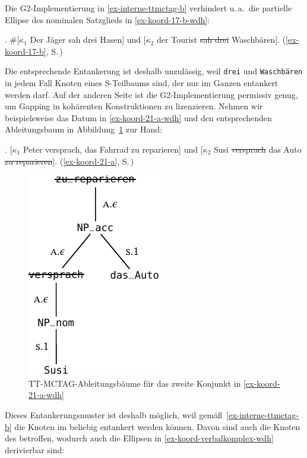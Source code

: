 Die G2-Implementierung in \ref{ex-interne-ttmctag-b} verhindert u.\,a.\ die partielle Ellipse des nominalen Satzglieds in \ref{ex-koord-17-b-wdh}:

\ex. \#[$\kappa_1$ Der Jäger sah drei Hasen] und [$\kappa_2$ der Tourist \sout{sah drei} Waschbären]. \hfill
(\ref{ex-koord-17-b}, S.\,\pageref{ex-koord-17-b})\label{ex-koord-17-b-wdh}

Die entsprechende Entankerung ist deshalb unzulässig, weil {\tt drei} und {\tt Waschbä\-ren} in jedem Fall Knoten eines S-Teilbaums sind, der nur im Ganzen entankert werden darf. Auf der  anderen Seite ist die G2-Implementierung permissiv genug, um Gapping in kohärenten Konstruktionen zu lizenzieren. Nehmen wir beispielsweise das Datum in \ref{ex-koord-21-a-wdh} und den entsprechenden Ableitungsbaum in Abbildung~\ref{fig-deanchoring-koord-18} zur Hand: 

\ex. \label{ex-koord-21-a-wdh} [$\kappa_1$ Peter versprach, das Fahrrad zu reparieren] und [$\kappa_2$ Susi \sout{versprach} das Auto \sout{zu reparieren}]. \hfill (\ref{ex-koord-21-a}, S.\,\pageref{ex-koord-21-a})

\begin{figure}[t]
\centering
\includegraphics{graphics/abb827.pdf}
\caption{\label{fig-deanchoring-koord-18}TT-MCTAG-Ableitungsbäume für das zweite Konjunkt in \ref{ex-koord-21-a-wdh}}
\end{figure}
Dieses Entankerungsmuster ist deshalb möglich, weil gemä\ss\ \ref{ex-interne-ttmctag-b} die Knoten im  beliebig entankert werden können. Davon sind auch die Knoten des  betroffen, wodurch auch die Ellipsen in \ref{ex-koord-verbalkomplex-wdh} derivierbar sind:   

